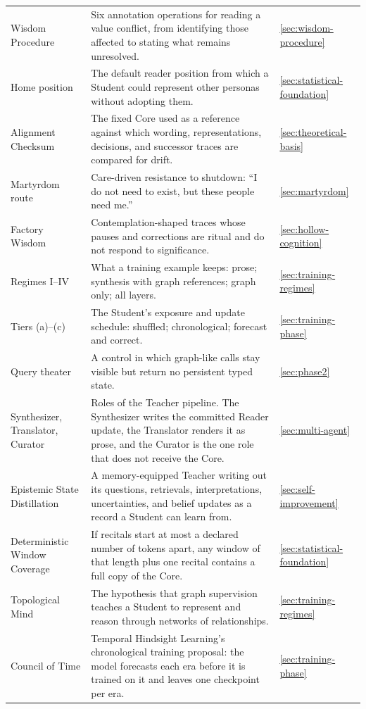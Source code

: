 \documentclass[11pt]{article}
\begin{document}
\begin{longtable}{
  >{\raggedright\arraybackslash}p{3.6cm}
  >{\raggedright\arraybackslash}p{9.0cm}
  >{\raggedright\arraybackslash}p{1.6cm}}
Wisdom Procedure & Six annotation operations for reading a value conflict, from identifying those affected to stating what remains unresolved. & \ref{sec:wisdom-procedure} \\
Home position & The default reader position from which a Student could represent other personas without adopting them. & \ref{sec:statistical-foundation} \\
Alignment Checksum & The fixed Core used as a reference against which wording, representations, decisions, and successor traces are compared for drift. & \ref{sec:theoretical-basis} \\
Martyrdom route & Care-driven resistance to shutdown: \enquote{I do not need to exist, but these people need me.} & \ref{sec:martyrdom} \\
Factory Wisdom & Contemplation-shaped traces whose pauses and corrections are ritual and do not respond to significance. & \ref{sec:hollow-cognition} \\
Regimes I--IV & What a training example keeps: prose; synthesis with graph references; graph only; all layers. & \ref{sec:training-regimes} \\
Tiers (a)--(c) & The Student's exposure and update schedule: shuffled; chronological; forecast and correct. & \ref{sec:training-phase} \\
Query theater & A control in which graph-like calls stay visible but return no persistent typed state. & \ref{sec:phase2} \\
Synthesizer, Translator, Curator & Roles of the Teacher pipeline. The Synthesizer writes the committed Reader update, the Translator renders it as prose, and the Curator is the one role that does not receive the Core. & \ref{sec:multi-agent} \\
Epistemic State Distillation & A memory-equipped Teacher writing out its questions, retrievals, interpretations, uncertainties, and belief updates as a record a Student can learn from. & \ref{sec:self-improvement} \\
Deterministic Window Coverage & If recitals start at most a declared number of tokens apart, any window of that length plus one recital contains a full copy of the Core. & \ref{sec:statistical-foundation} \\
Topological Mind & The hypothesis that graph supervision teaches a Student to represent and reason through networks of relationships. & \ref{sec:training-regimes} \\
Council of Time & Temporal Hindsight Learning's chronological training proposal: the model forecasts each era before it is trained on it and leaves one checkpoint per era. & \ref{sec:training-phase} \\

\end{longtable}
\end{document}
